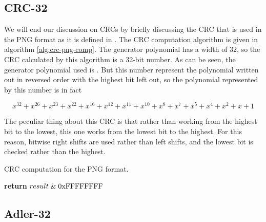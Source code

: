 \subsection{CRC-32}
\label{sec:pngcrc}

We will end our discussion on CRCs by briefly discussing the CRC that
is used in the PNG format as it is defined in
\cite{boutel:_png_portab_networ_graph_specif_version12}. The CRC
computation algorithm is given in algorithm
\ref{alg:crc-png-comp}. The generator polynomial has a width of $32$,
so the CRC calculated by this algorithm is a 32-bit number. As can be
seen, the generator polynomial used is . But this number
represent the polynomial written out in reversed order with the highest bit
left out, so the polynomial represented by this number is in fact

\begin{equation*}
  x^{32} + x^{26} + x^{23} + x^{22} + x^{16} + x^{12} + x^{11} + x^{10} + x^8 + x^7 + x^5 + x^4 + x^2 + x + 1
\end{equation*}

The peculiar thing about this CRC is that rather than working from the
highest bit to the lowest, this one works from the lowest bit to the
highest. For this reason, bitwise right shifts are used rather than
left shifts, and the lowest bit is checked rather than the
highest.

\begin{algorithm}[H]
  \caption{CRC computation for the PNG format.}
  \label{alg:crc-png-comp}
  \begin{algorithmic}[1]


    \Else
    \EndIf
    \EndRepeatn

    \EndForEach

    \State \textbf{return}  $result \mathrel{\&} \mathrm{0xFFFFFFFF}$
    \EndProcedure

  \end{algorithmic}
\end{algorithm}


\subsection{Adler-32}

